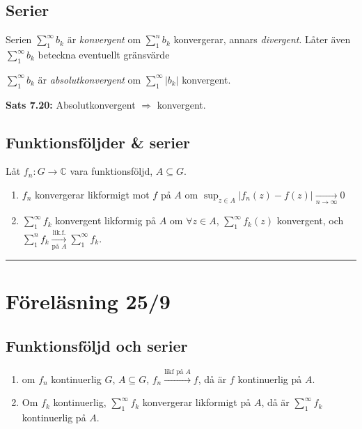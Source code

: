 \subsection{Serier}
Serien $\sum_1^\infty b_k$ är \emph{konvergent} om $\sum_1^n b_k$ konvergerar, annars \emph{divergent}. Låter även $\sum_1^\infty b_k$ beteckna eventuellt gränsvärde

$\sum_1^\infty b_k$ är \emph{absolutkonvergent} om $\sum_1^\infty |b_k|$ konvergent.

\textbf{Sats 7.20:} Absolutkonvergent $\Rightarrow$ konvergent.

\subsection{Funktionsföljder \& serier}
Låt $f_n : G \to \mathbb{C}$ vara funktionsföljd, $A \subseteq G$.

\begin{definition}
\begin{enumerate}[label=\textcircled{\alph*}]
  \item $f_n$ konvergerar likformigt mot $f$ på $A$ om $\displaystyle\sup_{z \in A} |f_n(z) - f(z)| \xrightarrow[n \to \infty]{} 0$
  \item $\sum_1^\infty f_k$ konvergent likformig på $A$ om $\forall z \in A$, $\sum_1^\infty f_k(z)$ konvergent, och $\sum_1^n f_k \xrightarrow[\text{på } A]{\text{lik.f.}} \sum_1^\infty f_k$.
\end{enumerate}
\end{definition}

\noindent\rule{\linewidth}{0.4pt}

\section{Föreläsning 25/9}

\subsection{Funktionsföljd och serier}
\begin{theorem}[Proposition 7.25]
\begin{enumerate}[label=\alph*)]
  \item om $f_n$ kontinuerlig $G$, $A \subseteq G$, $f_n \xrightarrow{\text{likf på } A} f$, då är $f$ kontinuerlig på $A$.
  \item Om $f_k$ kontinuerlig, $\sum_1^\infty f_k$ konvergerar likformigt på $A$, då är $\sum_1^\infty f_k$ kontinuerlig på $A$.
\end{enumerate}
\end{theorem}

